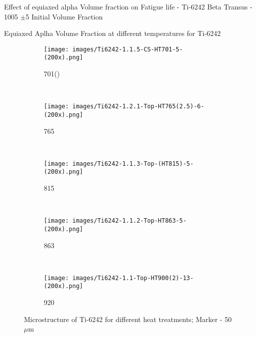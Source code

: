 \documentclass[10pt]{beamer}
\begin{document}

\begin{frame}[fragile]{Effect of equiaxed alpha Volume fraction on Fatigue life - Ti-6242}
Beta Transus - 1005 $\pm$5 \degC
Initial Volume Fraction 


\end{frame}



\begin{frame}{Equiaxed Aplha Volume Fraction at different temperatures for Ti-6242}
\begin{figure}[H]
    \centering
    \begin{subfigure}{0.25\textwidth}
        \texttt{[image: images/Ti6242-1.1.5-CS-HT701-5-(200x).png]}
        \caption{701\degC ()}
        \label{fig:Ti-6242 HT700}
    \end{subfigure}    
    ~
    \begin{subfigure}{0.25\textwidth}
        \texttt{[image: images/Ti6242-1.2.1-Top-HT765(2.5)-6-(200x).png]}
        \caption{765\degC}
        \label{fig:Ti-6242 HT752}
    \end{subfigure}   
   \\
    \begin{subfigure}{0.25\textwidth}
        \texttt{[image: images/Ti6242-1.1.3-Top-(HT815)-5-(200x).png]}
        \caption{815\degC}
        \label{fig:Ti-6242 HT815}
    \end{subfigure}
    ~
    \begin{subfigure}{0.25\textwidth}
        \texttt{[image: images/Ti6242-1.1.2-Top-HT863-5-(200x).png]}
        \caption{863\degC}
        \label{fig:Ti-6242 HT863}
    \end{subfigure}
    ~
    \begin{subfigure}{0.25\textwidth}
        \texttt{[image: images/Ti6242-1.1-Top-HT900(2)-13-(200x).png]}
        \caption{920\degC}
        \label{fig:Ti-6242 HT920}
    \end{subfigure}        
   
    \caption{Microstructure of Ti-6242 for different heat treatments; Marker - 50$\mu$m}
    
\end{figure}
\end{frame}



\end{document}
